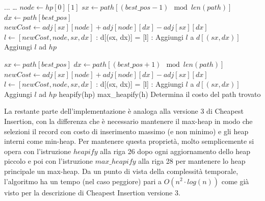 \documentclass[a4paper,12pt]{report}
\begin{document}
\begin{tcolorbox}[colframe=black, colback=white, boxrule=0.5pt, title=Furthest Insertion Versione 3, coltitle=black, fonttitle=\bfseries, colbacktitle=white, breakable]
  \begin{algorithmic}[1]
    \State ...
      \State \dots
        \State $node \gets hp[0][1]$
        \State $sx \gets path[(best\_pos - 1) \mod len(path)]$
        \State $dx \gets path[best\_pos]$
        \State $newCost \gets adj[sx][node] + adj[node][dx] - adj[sx][dx]$
        \State $l \gets [newCost, node, sx, dx]$
        :
        \State d[(sx, dx)] = [l]
        \Else{}:
        \State Aggiungi $l$ a $d[(sx, dx)]$
        \EndIf
        \State Aggiungi $l$ ad $hp$
        
        \State $sx \gets path[best\_pos]$
        \State $dx \gets path[(best\_pos + 1) \mod len(path)]$
        \State $newCost \gets adj[sx][node] + adj[node][dx] - adj[sx][dx]$
        \State $l \gets [newCost, node, sx, dx]$
        :
            \State d[(sx, dx)] = [l]
        \Else{}:
            \State Aggiungi $l$ a $d[(sx, dx)]$
        \EndIf
        \State Aggiungi $l$ ad $hp$
        \State heapify(hp)
      \EndFor
      \State max\_heapify(h)
    \EndWhile
    \State Determina il costo del path trovato
  \end{algorithmic}
\end{tcolorbox}
La restante parte dell'implementazione è analoga alla versione 3 di Cheapest Insertion, con la differenza che è necessario mantenere il max-heap in modo che selezioni il record con costo di inserimento massimo (e non minimo) e gli heap interni come min-heap. Per mantenere questa proprietà, molto semplicemente si opera con l'istruzione $heapify$ alla riga 26 dopo ogni aggiornamento dello heap piccolo e poi con l'istruzione $max\_heapify$ alla riga 28 per mantenere lo heap principale un max-heap. \newline
Da un punto di vista della complessità temporale, l'algoritmo ha un tempo (nel caso peggiore) pari a $O(n^2 \cdot log(n))$ come già visto per la descrizione di Cheapest Insertion versione 3.
\end{document}
